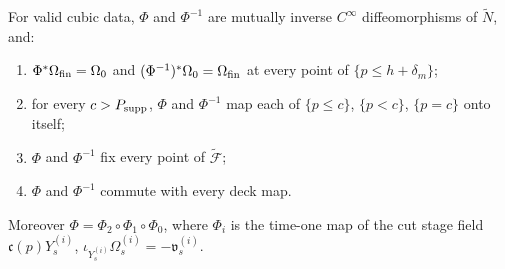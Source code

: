 \begin{proposition}\label{prop:shd4-moser}
For valid cubic data, $\Phi$ and $\Phi^{-1}$ are mutually inverse $C^\infty$ diffeomorphisms of $\widetilde N$, and:
\begin{enumerate}[label=(\alph*)]
\item $\Phi^*\Omega_{\rm fin}=\Omega_0$ and $(\Phi^{-1})^*\Omega_0=\Omega_{\rm fin}$ at every point of $\{p\le h+\delta_m\}$;
\item for every $c>P_{\rm supp}$, $\Phi$ and $\Phi^{-1}$ map each of $\{p\le c\}$, $\{p<c\}$, $\{p=c\}$ onto itself;
\item $\Phi$ and $\Phi^{-1}$ fix every point of $\widetilde{\mathcal F}$;
\item $\Phi$ and $\Phi^{-1}$ commute with every deck map.
\end{enumerate}
Moreover $\Phi=\Phi_2\circ\Phi_1\circ\Phi_0$, where $\Phi_i$ is the time-one map of the cut stage field $\mathfrak c(p)Y^{(i)}_s$,
$\iota_{Y^{(i)}_s}\Omega^{(i)}_s=-\mathfrak v^{(i)}_s$.
\end{proposition}

